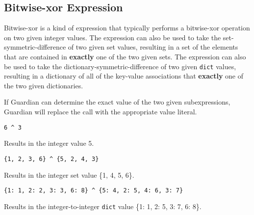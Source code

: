 
\subsection{Bitwise-xor Expression}
{
	Bitwise-xor is a kind of expression that typically performs
	a bitwise-xor operation on two given integer values.
	The expression can also be used to take the set-symmetric-difference
	of two given
	set values, resulting in a set of the elements that are contained in
	\textbf{exactly} one of the two given sets.
	The expression can also be used to take the
	dictionary-symmetric-difference of two given
	\texttt{dict} values, resulting in a dictionary of all of the key-value
	associations that \textbf{exactly} one of the two given
	dictionaries.
	
	If Guardian can determine the exact value of the two given subexpressions,
	Guardian will replace the call with the appropriate value literal.
	
	\begin{itemize}
	{
		\item \texttt{6 \^{} 3}
		
			Results in the integer value 5.
		
		\item \texttt{\{1, 2, 3, 6\} \^{} \{5, 2, 4, 3\}}
		
			Results in the integer set value \{1, 4, 5, 6\}.
		
		\item \texttt{\{1: 1, 2: 2, 3: 3, 6: 8\} \^{} \{5: 4, 2: 5, 4: 6, 3: 7\}}
		
			Results in the integer-to-integer \texttt{dict}
			value \{1: 1, 2: 5, 3: 7, 6: 8\}.
	}
	\end{itemize}
}
